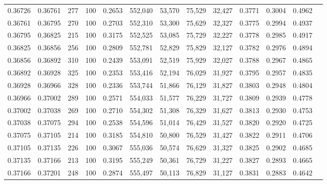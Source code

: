 \begin{tabular}{rrrrrrrrrrrrr}
0.36726 & 0.36761 &   277 & 100 &                                     0.2653 & 552,040 &  53,570 &  75,529 &  32,427 & 0.3771 & 0.3004 & 0.4962 \\
0.36761 & 0.36795 &   270 & 100 &                                     0.2703 & 552,310 &  53,300 &  75,629 &  32,327 & 0.3775 & 0.2994 & 0.4937 \\
0.36795 & 0.36825 &   215 & 100 &                                     0.3175 & 552,525 &  53,085 &  75,729 &  32,227 & 0.3778 & 0.2985 & 0.4917 \\
0.36825 & 0.36856 &   256 & 100 &                                     0.2809 & 552,781 &  52,829 &  75,829 &  32,127 & 0.3782 & 0.2976 & 0.4894 \\
0.36856 & 0.36892 &   310 & 100 &                                     0.2439 & 553,091 &  52,519 &  75,929 &  32,027 & 0.3788 & 0.2967 & 0.4865 \\
0.36892 & 0.36928 &   325 & 100 &                                     0.2353 & 553,416 &  52,194 &  76,029 &  31,927 & 0.3795 & 0.2957 & 0.4835 \\
0.36928 & 0.36966 &   328 & 100 &                                     0.2336 & 553,744 &  51,866 &  76,129 &  31,827 & 0.3803 & 0.2948 & 0.4804 \\
0.36966 & 0.37002 &   289 & 100 &                                     0.2571 & 554,033 &  51,577 &  76,229 &  31,727 & 0.3809 & 0.2939 & 0.4778 \\
0.37002 & 0.37038 &   269 & 100 &                                     0.2710 & 554,302 &  51,308 &  76,329 &  31,627 & 0.3813 & 0.2930 & 0.4753 \\
0.37038 & 0.37075 &   294 & 100 &                                     0.2538 & 554,596 &  51,014 &  76,429 &  31,527 & 0.3820 & 0.2920 & 0.4725 \\
0.37075 & 0.37105 &   214 & 100 &                                     0.3185 & 554,810 &  50,800 &  76,529 &  31,427 & 0.3822 & 0.2911 & 0.4706 \\
0.37105 & 0.37135 &   226 & 100 &                                     0.3067 & 555,036 &  50,574 &  76,629 &  31,327 & 0.3825 & 0.2902 & 0.4685 \\
0.37135 & 0.37166 &   213 & 100 &                                     0.3195 & 555,249 &  50,361 &  76,729 &  31,227 & 0.3827 & 0.2893 & 0.4665 \\
0.37166 & 0.37201 &   248 & 100 &                                     0.2874 & 555,497 &  50,113 &  76,829 &  31,127 & 0.3831 & 0.2883 & 0.4642 \\

\end{tabular}

